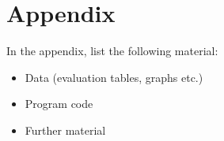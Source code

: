 \newpage
\section{Appendix}
\label{sec:Appendix}

In the appendix, list the following material:

\begin{itemize}
 \item Data (evaluation tables, graphs etc.)
 \item Program code
 \item Further material
\end{itemize}
